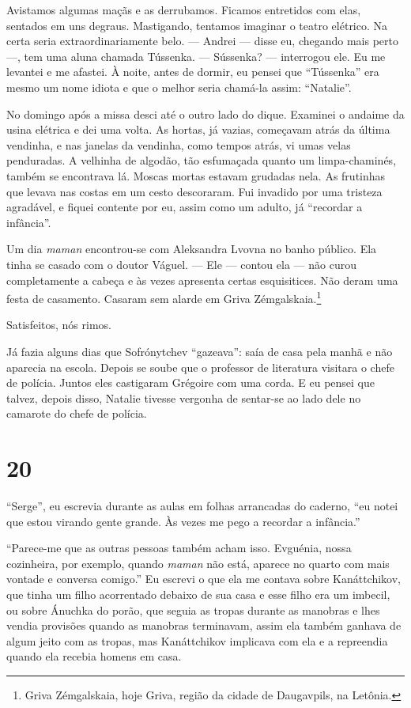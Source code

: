 Avistamos algumas maçãs e as derrubamos. Ficamos entretidos com elas,
sentados em uns degraus. Mastigando, tentamos imaginar o teatro
elétrico. Na certa seria extraordinariamente belo. --- Andrei --- disse
eu, chegando mais perto ---, tem uma aluna chamada Tússenka. ---
Sússenka? --- interrogou ele. Eu me levantei e me afastei. À noite,
antes de dormir, eu pensei que ``Tússenka'' era mesmo um nome idiota e
que o melhor seria chamá-la assim: ``Natalie''.

No domingo após a missa desci até o outro lado do dique. Examinei o
andaime da usina elétrica e dei uma volta. As hortas, já vazias,
começavam atrás da última vendinha, e nas janelas da vendinha, como
tempos atrás, vi umas velas penduradas. A velhinha de algodão, tão
esfumaçada quanto um limpa-chaminés, também se encontrava lá. Moscas
mortas estavam grudadas nela. As frutinhas que levava nas costas em um
cesto descoraram. Fui invadido por uma tristeza agradável, e fiquei
contente por eu, assim como um adulto, já ``recordar a infância''.

Um dia \emph{maman} encontrou-se com Aleksandra Lvovna no banho público.
Ela tinha se casado com o doutor Váguel. --- Ele --- contou ela --- não
curou completamente a cabeça e às vezes apresenta certas esquisitices.
Não deram uma festa de casamento. Casaram sem alarde em Griva
Zémgalskaia.\footnote{Griva Zémgalskaia, hoje Griva, região da cidade de
  Daugavpils, na Letônia.}

Satisfeitos, nós rimos.

Já fazia alguns dias que Sofrónytchev ``gazeava'': saía de casa pela
manhã e não aparecia na escola. Depois se soube que o professor de
literatura visitara o chefe de polícia. Juntos eles castigaram Grégoire
com uma corda. E eu pensei que talvez, depois disso, Natalie tivesse
vergonha de sentar-se ao lado dele no camarote do chefe de polícia.

\section{20}

``Serge'', eu escrevia durante as aulas em folhas arrancadas do caderno,
``eu notei que estou virando gente grande. Às vezes me pego a recordar a
infância.''

``Parece-me que as outras pessoas também acham isso. Evguénia, nossa
cozinheira, por exemplo, quando \emph{maman} não está, aparece no quarto
com mais vontade e conversa comigo.'' Eu escrevi o que ela me contava
sobre Kanáttchikov, que tinha um filho acorrentado debaixo de sua casa e
esse filho era um imbecil, ou sobre Ánuchka do porão, que seguia as
tropas durante as manobras e lhes vendia provisões quando as manobras
terminavam, assim ela também ganhava de algum jeito com as tropas, mas
Kanáttchikov implicava com ela e a repreendia quando ela recebia homens
em casa.


